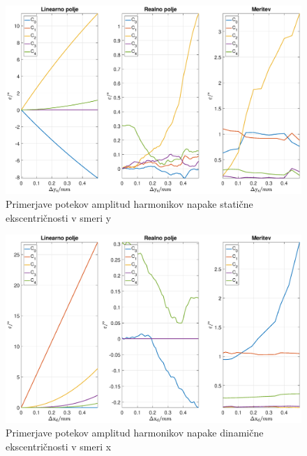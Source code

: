 \begin{figure}[ht]
	\centering
	\includegraphics[width=\columnwidth]{./Slike/primerjava_ys.eps}
	\caption{Primerjave potekov amplitud harmonikov napake  statične ekscentričnosti v smeri y}
	\label{primerjava_xs}
\end{figure}
\begin{figure}[ht]
	\centering
	\includegraphics[width=\columnwidth]{./Slike/primerjava_xd.eps}
	\caption{Primerjave potekov amplitud harmonikov napake  dinamične ekscentričnosti v smeri x}
	\label{primerjava_xs}
\end{figure}
